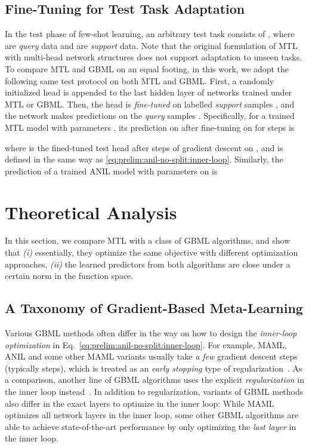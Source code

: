 \documentclass{article}
\begin{document}
\subsection{Fine-Tuning for Test Task Adaptation}\label{sec:prelim:fine-tune}
In the test phase of few-shot learning, an arbitrary test task  consists of
,
\label{eq:prelim:def-test-task}
where  are \textit{query} data and  are \textit{support} data. Note that the original formulation of MTL with multi-head network structures does not support adaptation to unseen tasks. To compare MTL and GBML on an equal footing, in this work, we adopt the following same test protocol on both MTL and GBML. First, a randomly initialized head  is appended to the last hidden layer of networks trained under MTL or GBML. Then, the head  is \textit{fine-tuned} on labelled \textit{support} samples , and the network makes predictions on the \textit{query} samples .
Specifically, for a trained MTL model with parameters , its prediction on  after fine-tuning  on  for  steps is

where  is the fined-tuned test head after  steps of gradient descent on , and  is defined in the same way as \eqref{eq:prelim:anil-no-split:inner-loop}. Similarly, the prediction of a trained ANIL model with parameters  on  is


\vspace{-1em}
\section{Theoretical Analysis}
\label{sec:theory}
In this section, we compare MTL with a class of GBML algorithms, and show that \textit{(i)} essentially, they optimize the same objective with different optimization approaches, \textit{(ii)} the learned predictors from both algorithms are close under a certain norm in the function space. 

\vspace{-1em}
\subsection{A Taxonomy of Gradient-Based Meta-Learning}
Various GBML methods often differ in the way on how to design the \emph{inner-loop optimization} in Eq.~\eqref{eq:prelim:anil-no-split:inner-loop}. For example, MAML, ANIL and some other MAML variants usually take \textit{a few} gradient descent steps (typically  steps), which is treated as an \textit{early stopping} type of regularization~\cite{imaml,grant2018recasting}. As a comparison, another line of GBML algorithms uses the explicit \textit{ regularization} in the inner loop instead~\cite{imaml,metaOptNet,r2d2,zhou2019efficient,goldblum2020unraveling}. In addition to regularization, variants of GBML methods also differ in the exact layers to optimize in the inner loop: While MAML optimizes all network layers in the inner loop, some other GBML algorithms are able to achieve state-of-the-art performance \cite{metaOptNet} by only optimizing the \textit{last layer} in the inner loop.
\end{document}
